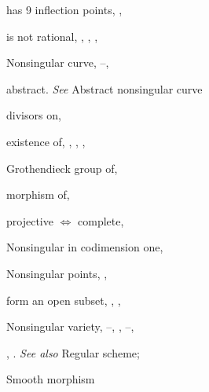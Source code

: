 {{\noindent\hspace*{7.5bp}has 9 inflection points, , \par
\noindent\hspace*{7.5bp}is not rational, , , , \par
\noindent\hspace*{0.0bp}Nonsingular curve, --, \par
\noindent\hspace*{7.5bp}abstract. \emph{See} Abstract nonsingular curve\par
\noindent\hspace*{7.5bp}divisors on, \par
\noindent\hspace*{7.5bp}existence of, , , , \par
\noindent\hspace*{7.5bp}Grothendieck group of, \par
\noindent\hspace*{7.5bp}morphism of, \par
\noindent\hspace*{7.5bp}projective $\Leftrightarrow$ complete, \par
\noindent\hspace*{0.0bp}Nonsingular in codimension one, \par
\noindent\hspace*{0.0bp}Nonsingular points, , \par
\noindent\hspace*{7.5bp}form an open subset, , , \par
\noindent\hspace*{0.0bp}Nonsingular variety, --, , --,\par
}\hfill%
\parbox[t]{162.5bp}{\fontsize{8.05}{8.49}\selectfont%
\raggedright\setlength{\parskip}{0pt}%
\noindent\hspace*{15.0bp}, . \emph{See also} Regular scheme;\par
\noindent\hspace*{15.0bp}Smooth morphism\par
}}
